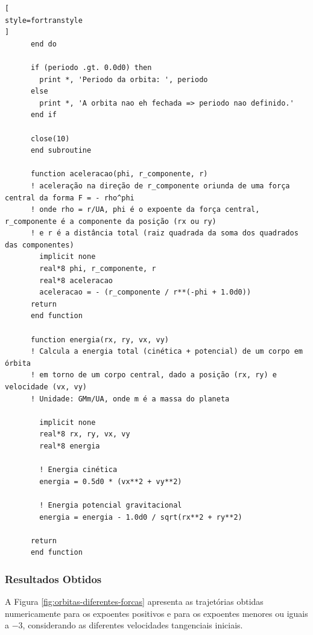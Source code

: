 \documentclass[12pt,a4paper]{article}
\begin{document}
\begin{lstlisting}[
style=fortranstyle
]
      end do

      if (periodo .gt. 0.0d0) then
        print *, 'Periodo da orbita: ', periodo
      else
        print *, 'A orbita nao eh fechada => periodo nao definido.'
      end if

      close(10)
      end subroutine

      function aceleracao(phi, r_componente, r)
      ! aceleração na direção de r_componente oriunda de uma força central da forma F = - rho^phi 
      ! onde rho = r/UA, phi é o expoente da força central, r_componente é a componente da posição (rx ou ry)
      ! e r é a distância total (raiz quadrada da soma dos quadrados das componentes)
        implicit none
        real*8 phi, r_componente, r
        real*8 aceleracao
        aceleracao = - (r_componente / r**(-phi + 1.0d0))
      return
      end function

      function energia(rx, ry, vx, vy)
      ! Calcula a energia total (cinética + potencial) de um corpo em órbita
      ! em torno de um corpo central, dado a posição (rx, ry) e velocidade (vx, vy)
      ! Unidade: GMm/UA, onde m é a massa do planeta
      
        implicit none
        real*8 rx, ry, vx, vy
        real*8 energia

        ! Energia cinética
        energia = 0.5d0 * (vx**2 + vy**2)

        ! Energia potencial gravitacional
        energia = energia - 1.0d0 / sqrt(rx**2 + ry**2)

      return
      end function
\end{lstlisting}


\subsubsection{Resultados Obtidos}

A Figura \ref{fig:orbitas-diferentes-forcas} apresenta as trajetórias obtidas numericamente para os expoentes positivos e para os expoentes menores ou iguais a $-3$, considerando as diferentes velocidades tangenciais iniciais.
\end{document}
